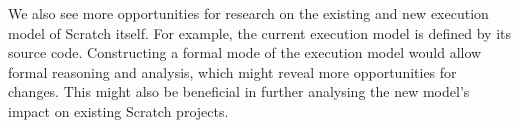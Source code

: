 \documentclass[../main]{subfiles}
\begin{document}
We also see more opportunities for research on the existing and new execution model of Scratch itself.
For example, the current execution model is defined by its source code.
Constructing a formal mode of the execution model would allow formal reasoning and analysis, which might reveal more opportunities for changes.
This might also be beneficial in further analysing the new model's impact on existing Scratch projects.
\end{document}
